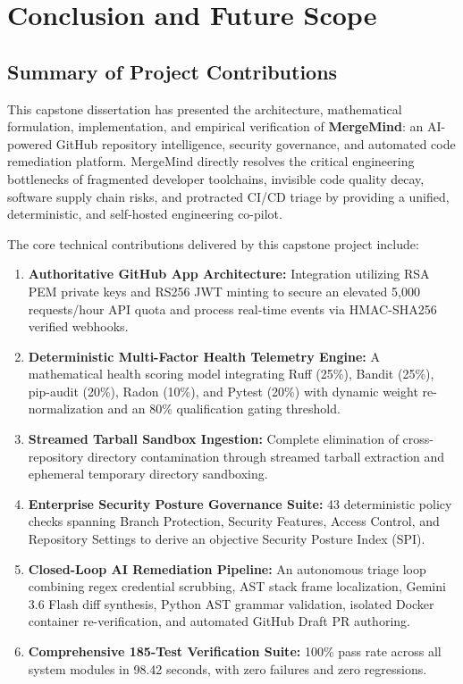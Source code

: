 \chapter{Conclusion and Future Scope}
\label{chap:conclusion-future-scope}

\section{Summary of Project Contributions}
\label{sec:conclusion-summary}

This capstone dissertation has presented the architecture, mathematical formulation, implementation, and empirical verification of \textbf{MergeMind}: an AI-powered GitHub repository intelligence, security governance, and automated code remediation platform. MergeMind directly resolves the critical engineering bottlenecks of fragmented developer toolchains, invisible code quality decay, software supply chain risks, and protracted CI/CD triage by providing a unified, deterministic, and self-hosted engineering co-pilot.

The core technical contributions delivered by this capstone project include:
\begin{enumerate}
    \item \textbf{Authoritative GitHub App Architecture:} Integration utilizing RSA PEM private keys and RS256 JWT minting to secure an elevated 5,000 requests/hour API quota and process real-time events via HMAC-SHA256 verified webhooks.
    \item \textbf{Deterministic Multi-Factor Health Telemetry Engine:} A mathematical health scoring model integrating Ruff (25\%), Bandit (25\%), pip-audit (20\%), Radon (10\%), and Pytest (20\%) with dynamic weight re-normalization and an 80\% qualification gating threshold.
    \item \textbf{Streamed Tarball Sandbox Ingestion:} Complete elimination of cross-repository directory contamination through streamed tarball extraction and ephemeral temporary directory sandboxing.
    \item \textbf{Enterprise Security Posture Governance Suite:} 43 deterministic policy checks spanning Branch Protection, Security Features, Access Control, and Repository Settings to derive an objective Security Posture Index (SPI).
    \item \textbf{Closed-Loop AI Remediation Pipeline:} An autonomous triage loop combining regex credential scrubbing, AST stack frame localization, Gemini 3.6 Flash diff synthesis, Python AST grammar validation, isolated Docker container re-verification, and automated GitHub Draft PR authoring.
    \item \textbf{Comprehensive 185-Test Verification Suite:} 100\% pass rate across all system modules in 98.42 seconds, with zero failures and zero regressions.
\end{enumerate}

